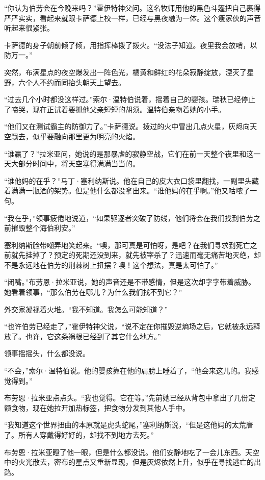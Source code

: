 \documentclass[AutoFakeBold=true]{book}
\begin{document}
``你认为伯劳会在今晚来吗？''霍伊特神父问。这名牧师用他的黑色斗篷把自己裹得严严实实，看起来就跟卡萨德上校一样，已经与黑夜融为一体。这个瘦家伙的声音听起来很紧张。

卡萨德的身子朝前倾了倾，用指挥棒拨了拨火。``没法子知道。夜里我会放哨，以防万一。''

突然，布满星点的夜空爆发出一阵色光，橘黄和鲜红的花朵寂静绽放，湮灭了星野，六个人不约而同抬头朝天上望去。

``过去几个小时都没这样过。''索尔·温特伯说着，摇着自己的婴孩。瑞秋已经停止了啼哭，现在正试着要抓他父亲短短的胡须。温特伯亲吻着她的小手。

``他们又在测试霸主的防御力了。''卡萨德说。拨过的火中冒出几点火星，灰烬向天空飘去，似乎要融向那里更为明亮的火焰。

``谁赢了？''拉米亚问，她说的是那暴虐的寂静空战，它们在前一天整个夜里和这一天大部分时间中，将天空塞得满满当当的。

``谁他妈的在乎？''马丁·塞利纳斯说。他在自己的皮大衣口袋里翻找，一副里头藏着满满一瓶酒的架势。但是他什么都没拿出来。``谁他妈的在乎啊。''他又咕哝了一句。

``我在乎，''领事疲倦地说道，``如果驱逐者突破了防线，他们将会在我们找到伯劳之前摧毁整个海伯利安。''

塞利纳斯脸带嘲弄地笑起来。``噢，那可真是可怕呀，是吧？在我们寻求到死亡之前就先挂掉了？预定的死期还没到来，就先被宰杀了？迅速而毫无痛苦地灭绝，却不是永远地在伯劳的荆棘树上扭摆？噢！这个想法，真是太可怕了。''

``闭嘴。''布劳恩·拉米亚说，她的声音还是不带感情，但是这次却字字带着威胁。她看着领事，``那么伯劳在哪儿？为什么我们找不到它？''

外交家凝视着火堆。``我不知道。我怎么可能知道？''

``也许伯劳已经走了，''霍伊特神父说，``说不定在你摧毁逆熵场之后，它就被永远释放了。也许，它这条祸根已经到了其它什么地方。''

领事摇摇头，什么都没说。

``不会，''索尔·温特伯说。他的婴孩靠在他的肩膀上睡着了，``他会来这儿的。我感觉得到。''

布劳恩·拉米亚点点头。``我也觉得。它在等。''先前她已经从背包中拿出了几份定额食物，现在她拉开加热标签，把食物分发到其他人手中。

``我知道这个世界扭曲的本原就是虎头蛇尾，''塞利纳斯说，``但是这他妈的太荒唐了。所有人穿戴得好好的，却找不到地方去死。''

布劳恩·拉米亚瞪了他一眼，但是什么都没说。他们安静地吃了一会儿东西。天空中的火光散去，密布的星点又重新显现，但是灰烬依然上升，似乎在寻找逃亡的出路。
\end{document}
